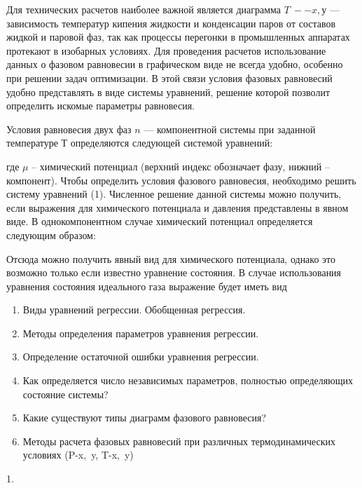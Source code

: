 Для технических расчетов наиболее важной является диаграмма $T~-- x, у$ --- зависимость температур кипения жидкости и конденсации паров от составов жидкой и паровой фаз, так как процессы перегонки в промышленных аппаратах протекают в изобарных условиях. Для проведения расчетов использование данных о фазовом равновесии в графическом виде не всегда удобно, особенно при решении задач оптимизации. В этой связи условия фазовых равновесий удобно представлять в виде системы уравнений, решение которой позволит определить искомые параметры равновесия. 

Условия равновесия двух фаз $n$ --- компонентной системы при заданной температуре Т определяются следующей системой уравнений:

где $\mu$ – химический потенциал (верхний индекс обозначает фазу, нижний – компонент). Чтобы определить условия фазового равновесия, необходимо решить систему уравнений (1). Численное решение данной системы можно получить, если выражения для химического потенциала и давления представлены в явном виде.
В однокомпонентном случае химический потенциал определяется следующим образом:

Отсюда можно получить явный вид для химического потенциала, однако это возможно только если известно уравнение состояния. В случае использования уравнения состояния идеального газа  выражение будет иметь вид

\begin{enumerate}
	\item Виды уравнений регрессии. Обобщенная регрессия.
	\item Методы определения параметров уравнения регрессии.
	\item Определение остаточной ошибки уравнения регрессии.
	\item Как определяется число независимых параметров, полностью определяющих состояние системы?
	\item Какие существуют типы диаграмм фазового равновесия?
	\item Методы расчета фазовых равновесий при различных термодинамических условиях (P-x, y, T-x, y)
\end{enumerate}
1. 